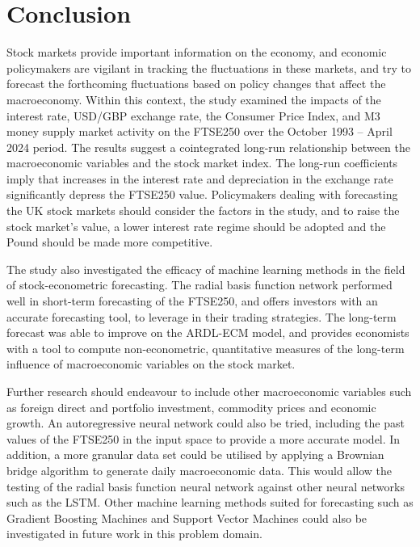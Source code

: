 \documentclass[11pt,a4paper]{article}
\begin{document}
\section{Conclusion}

Stock markets provide important information on the economy, 
and economic policymakers are vigilant in tracking the fluctuations 
in these markets, and try to forecast the 
forthcoming fluctuations based on policy changes that affect the macroeconomy.
Within this context, the study examined the 
impacts of the interest rate, USD/GBP
exchange rate, the Consumer Price Index, and 
M3 money supply market activity on
the FTSE250 over the October 1993 – April 2024 period.
The results suggest a cointegrated long-run
relationship between the macroeconomic variables and the stock market index. 
The long-run coefficients imply that
increases in the interest rate and depreciation in the exchange rate
significantly depress the FTSE250 value. 
Policymakers dealing with forecasting the UK stock markets
should consider the factors in the study, and to raise the stock
market's value, a lower interest rate regime should be adopted and 
the Pound should be made more competitive.

The study also investigated the efficacy of machine learning methods in 
the field of stock-econometric forecasting. The radial basis function network performed well in
short-term forecasting of the FTSE250, and offers investors with an accurate forecasting tool, 
to leverage in their trading strategies. The long-term forecast was able to improve on the ARDL-ECM model, and provides 
economists with a tool to compute non-econometric, quantitative measures of the 
long-term influence of macroeconomic variables on the stock market. 

Further research should endeavour to include other macroeconomic variables such as 
foreign direct and portfolio investment, commodity prices and economic growth.
An autoregressive neural network could also be tried, including the past values of the 
FTSE250 in the input space to provide a more accurate model. In addition, 
a more granular data set could be utilised by applying a 
Brownian bridge algorithm to generate daily macroeconomic data. This would allow 
the testing of the radial basis function neural network against other neural networks 
such as the LSTM. Other machine learning methods suited for 
forecasting such as Gradient Boosting Machines and Support Vector Machines could 
also be investigated in future work in this problem domain. 



\end{document}
